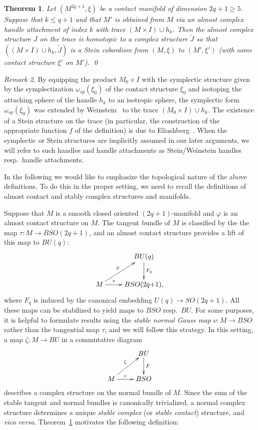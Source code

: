 \documentclass[12pt]{amsart}
\newtheorem{Theorem}{Theorem}[section]
\theoremstyle{remark}
\newtheorem{Remark}[Theorem]{Remark}
\begin{document}
\begin{Theorem}\label{thm:h-principleforhandles}
Let $(M^{2q{+}1},\xi)$ be a contact manifold of dimension $2q{+}1 \geq 5$.
Suppose that $k \leq q{+}1$ and that $M'$ is obtained from $M$ 
via an 
almost complex handle attachment  of index $k$ with trace $(M \times I) \cup h_{k}$. 
Then the almost complex structure $J$ on the trace 
is homotopic to a complex structure $\widetilde{J}$ so that
$((M\times I)\cup h_{k}, \widetilde{J})$ 
is a Stein cobordism  from $(M, \xi)$ to $(M',\xi')$ (with some contact structure $\xi '$ on 
$M'$). \qed
%
\end{Theorem}

\begin{Remark}
By equipping the product $M_0\times I$ with the symplectic structure given by the symplectization $\omega _{sp}(\xi _0)$ 
of the contact 
structure $\xi _0$ and isotoping the attaching sphere of the handle $h_k$ to an
isotropic sphere, the symplectic form $\omega _{sp}(\xi _0)$ was extended by 
Weinstein~\cite{Weinstein} to the trace $(M_0\times I )\cup h_k$. The existence of a Stein 
structure on the trace (in particular, the construction of the appropriate function $f$ of
the definition) is due to Eliashberg~\cite{Cieliebak&Eliashberg12, Eliashberg??}. 
When the symplectic or Stein structures are implicitly assumed in our later arguments, we will refer to such 
handles and handle attachments as Stein/Weinstein handles resp.\ handle attachments.
\end{Remark} 

In the following we would like to emphasize the topological nature of the above definitions.
To do this in the proper setting, we need to recall the definitions of almost contact and
stably complex structures and manifolds.

Suppose that $M$ is a smooth closed oriented
$(2q{+}1)$-manifold and $\varphi$ is an almost contact structure on
$M$. The tangent bundle of $M$ is classified by the the map $\tau
\colon M\to BSO(2q{+}1)$, and an almost contact structure provides a
lift of this map to $BU(q)$:
%
\[ \xymatrix{  & BU(q) \ar[d]^-{F_q}\\
M \ar[r]^-{\tau} \ar[ur]^-{\varphi} & BSO (2q{+}1),} \]
%
where $F_q$ is induced by the canonical embedding $U(q)\to SO(2q{+}1)$. All these maps can be stabilized to yield maps to $BSO$ resp.\  $BU$. 
For some purposes, it is helpful to formulate results using the \emph{stable normal Gauss map}
$\nu\colon M\to BSO$ rather than the tangential map $\tau$, and we
will follow this strategy.
In this setting, a map $\zeta \colon M \to BU$ in a commutative diagram
%
\[ \xymatrix{  & BU \ar[d]^-F\\
M \ar[r]^-{\nu} \ar[ur]^-{\zeta} & BSO } 
\] 
describes a complex structure on the normal bundle of $M$.
Since the sum of the stable tangent and normal bundles is canonically trivialized, 
a normal complex structure determines a unique {\em stable complex} (or {\em stable contact}) structure,
and \emph{vica versa}.
Theorem~\ref{thm:h-principleforhandles} motivates the following definition:
\end{document}
